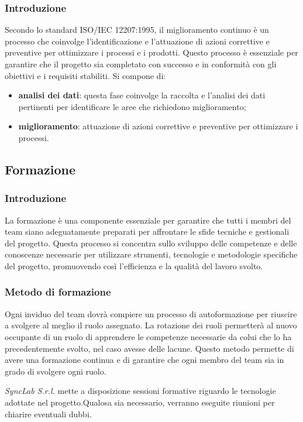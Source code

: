 \subsubsection{Introduzione}
Secondo lo standard ISO/IEC 12207:1995, il miglioramento continuo è un processo che coinvolge l'identificazione e l'attuazione di azioni correttive e preventive per ottimizzare i processi e i prodotti. Questo processo è essenziale per garantire che il progetto sia completato con successo e in conformità con gli obiettivi e i requisiti stabiliti. Si compone di:
\begin{itemize}
    \item \textbf{analisi dei dati}: questa fase coinvolge la raccolta e l'analisi dei dati pertinenti per identificare le aree che richiedono miglioramento;
    \item \textbf{miglioramento}: attuazione di azioni correttive e preventive per ottimizzare i processi.
\end{itemize}

\subsection{Formazione}
\subsubsection{Introduzione}
La formazione è una componente essenziale per garantire che tutti i membri del team siano adeguatamente preparati per affrontare le sfide tecniche e gestionali del progetto. Questa processo si concentra sullo sviluppo delle competenze e delle conoscenze necessarie per utilizzare strumenti, tecnologie e metodologie specifiche del progetto, promuovendo così l'efficienza e la qualità del lavoro svolto.

\subsubsection{Metodo di formazione}
Ogni inviduo del team dovrà compiere un processo di autoformazione per riuscire a svolgere al meglio il ruolo assegnato. La rotazione dei ruoli permetterà al nuovo occupante di un ruolo di apprendere le competenze necessarie da colui che lo ha precedentemente svolto, nel caso avesse delle lacune. Questo metodo permette di avere una formazione continua e di garantire che ogni membro del team sia in grado di svolgere ogni ruolo.

\textit{SyncLab S.r.l.} mette a disposizione sessioni formative riguardo le tecnologie adottate nel progetto.Qualosa sia necessario, verranno eseguite riunioni per chiarire eventuali dubbi.